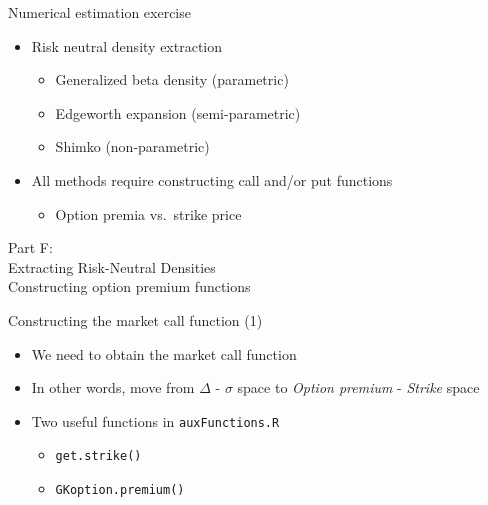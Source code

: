 \documentclass[ignorenonframetext,aspectratio=169]{beamer}
\providecommand{\tightlist}{%
  \setlength{\itemsep}{0pt}\setlength{\parskip}{0pt}}
\begin{document}
\begin{frame}{Numerical estimation exercise}

\begin{itemize}
\tightlist
\item
  Risk neutral density extraction

  \begin{itemize}
  \tightlist
  \item
    Generalized beta density (parametric)
  \item
    Edgeworth expansion (semi-parametric)
  \item
    Shimko (non-parametric)
  \end{itemize}
\item
  All methods require constructing call and/or put functions

  \begin{itemize}
  \tightlist
  \item
    Option premia vs.~strike price
  \end{itemize}
\end{itemize}

\end{frame}

\begin{frame}{}

\color{blue} \LARGE{Part F:}\\
\LARGE{Extracting Risk-Neutral Densities}\\
\Large{Constructing option premium functions}

\end{frame}

\begin{frame}[fragile]{Constructing the market call function (1)}

\begin{itemize}
\tightlist
\item
  We need to obtain the market call function
\item
  In other words, move from \(\Delta\) - \(\sigma\) space to
  \emph{Option premium} - \emph{Strike} space
\item
  Two useful functions in \texttt{auxFunctions.R}

  \begin{itemize}
  \tightlist
  \item
    \texttt{get.strike()}
  \item
    \texttt{GKoption.premium()}
  \end{itemize}
\end{itemize}

\end{frame}
\end{document}
